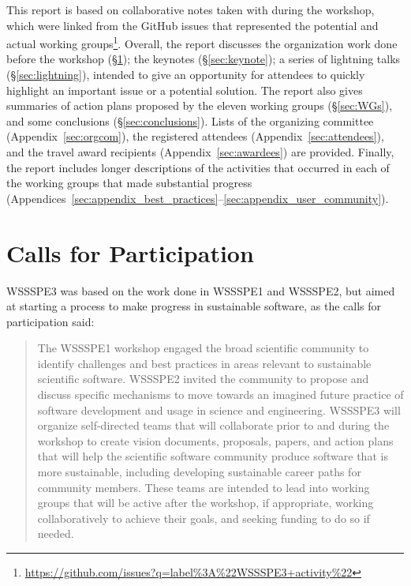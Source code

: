 \documentclass[11pt, oneside]{amsart}
\begin{document}
This report is based on collaborative notes taken with during the workshop,
which were linked from the GitHub issues that represented the potential and
actual working
groups\footnote{\url{https://github.com/issues?q=label\%3A\%22WSSSPE3+activity\%22}}.
Overall, the report discusses the organization work done before the workshop
(\S\ref{sec:preworkshop}); the keynotes (\S\ref{sec:keynote}); a series of
lightning talks (\S\ref{sec:lightning}), intended to give an opportunity for
attendees to quickly highlight an important issue or a potential solution. The
report also gives summaries of action plans proposed by the eleven working
groups (\S\ref{sec:WGs}), and some conclusions (\S\ref{sec:conclusions}).
Lists of the organizing committee (Appendix~\ref{sec:orgcom}), the registered
attendees (Appendix~\ref{sec:attendees}), and the travel award recipients
(Appendix~\ref{sec:awardees}) are provided. Finally, the report includes longer
descriptions of the activities that
occurred in each of the working groups that made substantial progress 
(Appendices~\ref{sec:appendix_best_practices}--\ref{sec:appendix_user_community}).

\section{Calls for Participation} \label{sec:preworkshop}

WSSSPE3 was based on the work done in WSSSPE1 and WSSSPE2, but aimed at starting
a process to make progress in sustainable software, as the calls for
participation said:

\begin{quote} The WSSSPE1 workshop engaged the broad scientific community to
identify challenges and best practices in areas relevant to sustainable
scientific software. WSSSPE2 invited the community to propose and discuss
specific mechanisms to move towards an imagined future practice of software
development and usage in science and engineering. WSSSPE3 will organize
self-directed teams that will collaborate prior to and during the workshop to
create vision documents, proposals, papers, and action plans that will help the
scientific software community produce software that is more sustainable,
including developing sustainable career paths for community members. These teams
are intended to lead into working groups that will be active after the workshop,
if appropriate, working collaboratively to achieve their goals, and seeking
funding to do so if needed. \end{quote}
\end{document}
